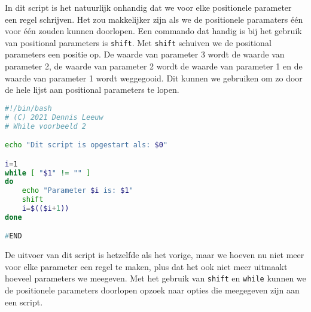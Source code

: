 In dit script is het natuurlijk onhandig dat we voor elke positionele parameter een regel schrijven. Het zou makkelijker zijn als we de positionele paramaters \'e\'en voor \'e\'en zouden kunnen doorlopen. Een commando dat handig is bij het gebruik van positional parameters is \texttt{shift}. Met \texttt{shift} schuiven we de positional parameters een positie op. De waarde van parameter 3 wordt de waarde van parameter 2, de waarde van parameter 2 wordt de waarde van parameter 1 en de waarde van parameter 1 wordt weggegooid. Dit kunnen we gebruiken om zo door de hele lijst aan positional parameters te lopen.

\begin{lstlisting}[language=bash]
#!/bin/bash
# (C) 2021 Dennis Leeuw
# While voorbeeld 2

echo "Dit script is opgestart als: $0"

i=1
while [ "$1" != "" ]
do
	echo "Parameter $i is: $1"
	shift
	i=$(($i+1))
done

#END
\end{lstlisting}
De uitvoer van dit script is hetzelfde als het vorige, maar we hoeven nu niet meer voor elke parameter een regel te maken, plus dat het ook niet meer uitmaakt hoeveel parameters we meegeven. Met het gebruik van \texttt{shift} en \texttt{while} kunnen we de positionele parameters doorlopen opzoek naar opties die meegegeven zijn aan een script.
